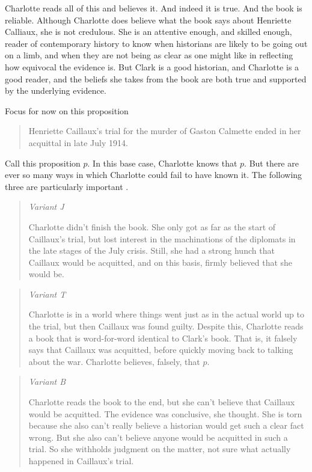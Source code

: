 \documentclass[11pt,]{book}
\begin{document}
Charlotte reads all of this and believes it. And indeed it is true. And the book is reliable. Although Charlotte does believe what the book says about Henriette Calliaux, she is not credulous. She is an attentive enough, and skilled enough, reader of contemporary history to know when historians are likely to be going out on a limb, and when they are not being as clear as one might like in reflecting how equivocal the evidence is. But Clark is a good historian, and Charlotte is a good reader, and the beliefs she takes from the book are both true and supported by the underlying evidence.

Focus for now on this proposition

\begin{quote}
Henriette Caillaux's trial for the murder of Gaston Calmette ended in her acquittal in late July 1914.
\end{quote}

Call this proposition \(p\). In this base case, Charlotte knows that \(p\). But there are ever so many ways in which Charlotte could fail to have known it. The following three are particularly important .

\begin{quote}
\emph{Variant J}

Charlotte didn't finish the book. She only got as far as the start of Caillaux's trial, but lost interest in the machinations of the diplomats in the late stages of the July crisis. Still, she had a strong hunch that Caillaux would be acquitted, and on this basis, firmly believed that she would be.
\end{quote}

\begin{quote}
\emph{Variant T}

Charlotte is in a world where things went just as in the actual world up to the trial, but then Caillaux was found guilty. Despite this, Charlotte reads a book that is word-for-word identical to Clark's book. That is, it falsely says that Caillaux was acquitted, before quickly moving back to talking about the war. Charlotte believes, falsely, that \(p\).
\end{quote}

\begin{quote}
\emph{Variant B}

Charlotte reads the book to the end, but she can't believe that Caillaux would be acquitted. The evidence was conclusive, she thought. She is torn because she also can't really believe a historian would get such a clear fact wrong. But she also can't believe anyone would be acquitted in such a trial. So she withholds judgment on the matter, not sure what actually happened in Caillaux's trial.
\end{quote}
\end{document}
